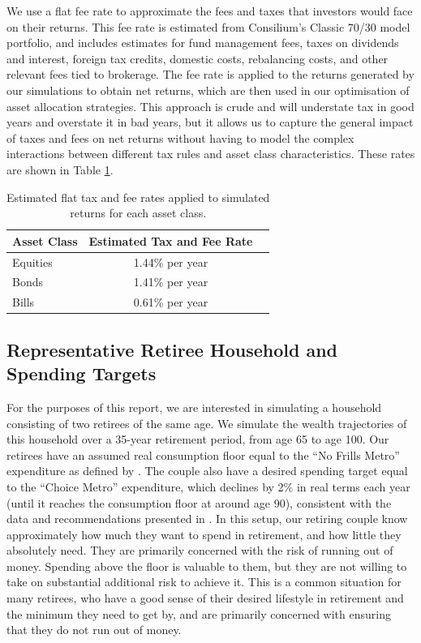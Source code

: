 \documentclass[11pt]{article}
\begin{document}
We use a flat fee rate to approximate the fees and taxes that investors would face on their returns. This fee rate is estimated from Consilium's Classic 70/30 model portfolio, and includes estimates for fund management fees, taxes on dividends and interest, foreign tax credits, domestic costs, rebalancing costs, and other relevant fees tied to brokerage. The fee rate is applied to the returns generated by our simulations to obtain net returns, which are then used in our optimisation of asset allocation strategies. This approach is crude and will understate tax in good years and overstate it in bad years, but it allows us to capture the general impact of taxes and fees on net returns without having to model the complex interactions between different tax rules and asset class characteristics. These rates are shown in Table \ref{tab:fee_rates}. 

\begin{table}[h!]
\centering
\begin{tabular}{lcc}
\toprule
\textbf{Asset Class} & \textbf{Estimated Tax and Fee Rate} \\
\midrule
Equities & 1.44\% per year \\
Bonds & 1.41\% per year \\
Bills & 0.61\% per year \\
\bottomrule
\end{tabular}
\caption{Estimated flat tax and fee rates applied to simulated returns for each asset class.}
\label{tab:fee_rates}
\end{table}


\subsection{Representative Retiree Household and Spending Targets}

For the purposes of this report, we are interested in simulating a household consisting of two retirees of the same age. We simulate the wealth trajectories of this household over a 35-year retirement period, from age 65 to age 100. Our retirees have an assumed real consumption floor equal to the ``No Frills Metro'' expenditure as defined by \textcite{matthews2025guidelines}. The couple also have a desired spending target equal to the ``Choice Metro'' expenditure, which declines by 2\% in real terms each year (until it reaches the consumption floor at around age 90), consistent with the data and recommendations presented in \textcite{riig2024spending}. In this setup, our retiring couple know approximately how much they want to spend in retirement, and how little they absolutely need. They are primarily concerned with the risk of running out of money. Spending above the floor is valuable to them, but they are not willing to take on substantial additional risk to achieve it. This is a common situation for many retirees, who have a good sense of their desired lifestyle in retirement and the minimum they need to get by, and are primarily concerned with ensuring that they do not run out of money.
\end{document}
